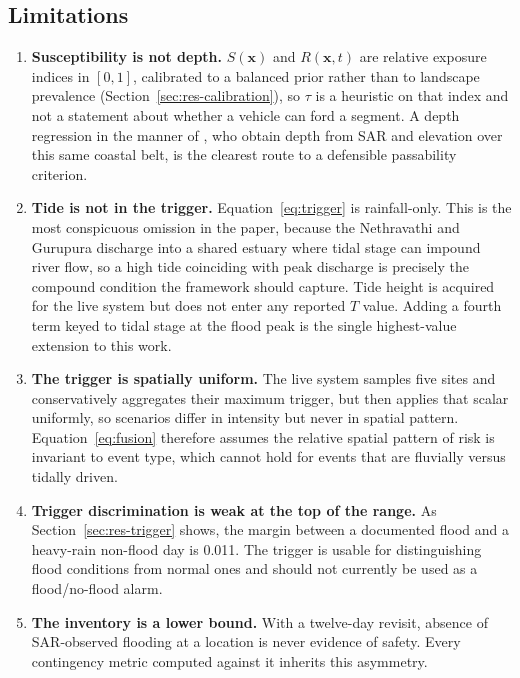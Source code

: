 \documentclass[10pt,twocolumn]{article}
\newcommand{\Sx}{S(\mathbf{x})}
\newcommand{\Rxt}{R(\mathbf{x},t)}
\begin{document}
\subsection{Limitations}
\label{sec:limitations}
\begin{enumerate}
\itemsep2pt
\item \textbf{Susceptibility is not depth.} $\Sx$ and $\Rxt$ are relative
      exposure indices in $[0,1]$, calibrated to a balanced prior rather than to
      landscape prevalence (Section~\ref{sec:res-calibration}), so $\tau$ is a
      heuristic on that index and not a statement about whether a vehicle can
      ford a segment. A depth regression in the manner of \citet{sadhwani2026},
      who obtain depth from SAR and elevation over this same coastal belt, is the
      clearest route to a defensible passability criterion.
\item \textbf{Tide is not in the trigger.} Equation~\eqref{eq:trigger} is
      rainfall-only. This is the most conspicuous omission in the paper, because
      the Nethravathi and Gurupura discharge into a shared estuary where tidal
      stage can impound river flow, so a high tide coinciding with peak discharge
      is precisely the compound condition the framework should capture. Tide
      height is acquired for the live system but does not enter any reported
      $T$ value. Adding a fourth term keyed to tidal stage at the flood peak is
      the single highest-value extension to this work.
\item \textbf{The trigger is spatially uniform.} The live system samples five
      sites and conservatively aggregates their maximum trigger, but then applies
      that scalar uniformly, so scenarios differ in intensity but never in spatial pattern.
      Equation~\eqref{eq:fusion} therefore assumes the relative spatial pattern
      of risk is invariant to event type, which cannot hold for events that are
      fluvially versus tidally driven.
\item \textbf{Trigger discrimination is weak at the top of the range.} As
      Section~\ref{sec:res-trigger} shows, the margin between a documented flood
      and a heavy-rain non-flood day is 0.011. The trigger is usable for
      distinguishing flood conditions from normal ones and should not currently
      be used as a flood/no-flood alarm.
\item \textbf{The inventory is a lower bound.} With a twelve-day revisit, absence
      of SAR-observed flooding at a location is never evidence of safety. Every
      contingency metric computed against it inherits this asymmetry.

\end{enumerate}
\end{document}
